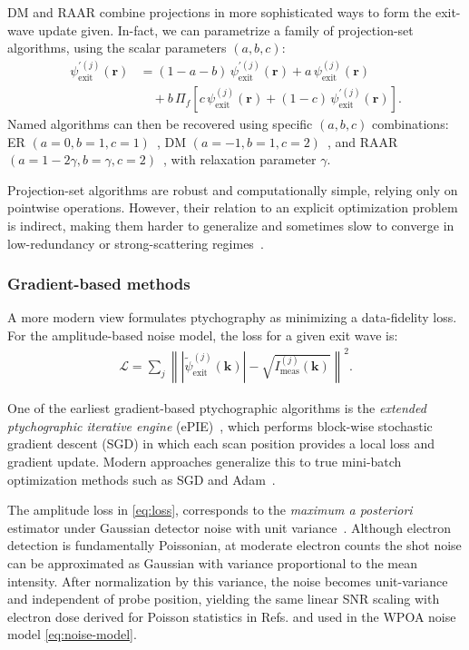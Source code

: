 \documentclass[pdflatex,sn-aps,iicol]{sn-jnl}%
\begin{document}
DM and RAAR combine projections in more sophisticated ways to form the exit-wave update given.
In-fact, we can parametrize a family of projection-set algorithms, using the scalar parameters $(a,b,c)$:
\begin{align}
\psi_{\text{exit}}^{'(j)}(\boldsymbol{r})
&=
(1-a-b)\,\psi_{\text{exit}}^{'(j)}(\boldsymbol{r})
+
a\,\psi_{\text{exit}}^{(j)}(\boldsymbol{r})
\nonumber\\
&\quad+
b\,\Pi_f\!\left[
c\,\psi_{\text{exit}}^{(j)}(\boldsymbol{r})
+
(1-c)\,\psi_{\text{exit}}^{'(j)}(\boldsymbol{r})
\right].
\label{eq:proj-fam}
\end{align}
Named algorithms can then be recovered using specific $(a,b,c)$ combinations:
ER $(a=0,b=1,c=1)$~\cite{Levi_1984}, DM $(a=-1,b=1,c=2)$~\cite{Elser_2003}, and RAAR $(a=1-2\gamma,b=\gamma,c=2)$~\cite{Luke_2004}, with relaxation parameter $\gamma$.

Projection-set algorithms are robust and computationally simple, relying only on pointwise operations.
However, their relation to an explicit optimization problem is indirect, making them harder to generalize and sometimes slow to converge in low-redundancy or strong-scattering regimes~\cite{Varnavides_2023}.

\subsubsection*{Gradient-based methods}

A more modern view formulates ptychography as minimizing a data-fidelity loss.
For the amplitude-based noise model, the loss for a given exit wave is:
\begin{align}
\mathcal{L}
=
\sum_j
\left\lVert
\left\lvert
\tilde{\psi}_{\text{exit}}^{(j)}(\boldsymbol{k})
\right\rvert
-
\sqrt{I_{\text{meas}}^{(j)}(\boldsymbol{k})}
\right\rVert^2.
\label{eq:loss}
\end{align}

One of the earliest gradient-based ptychographic algorithms is the \emph{extended ptychographic iterative engine} (ePIE)~\cite{Maiden_2009}, which performs block-wise stochastic gradient descent (SGD) in which each scan position provides a local loss and gradient update.
Modern approaches generalize this to true mini-batch optimization methods such as SGD and Adam~\cite{Lee_2025,Gilgenbach_2025,McCray_2025}.

The amplitude loss in \cref{eq:loss}, corresponds to the \emph{maximum a posteriori} estimator under Gaussian detector noise with unit variance~\cite{Gilgenbach_2025}.
Although electron detection is fundamentally Poissonian, at moderate electron counts the shot noise can be approximated as Gaussian with variance proportional to the mean intensity. 
After normalization by this variance, the noise becomes unit-variance and independent of probe position, yielding the same linear SNR scaling with electron dose derived for Poisson statistics in Refs.  and used in the WPOA noise model \cref{eq:noise-model}.
\end{document}

